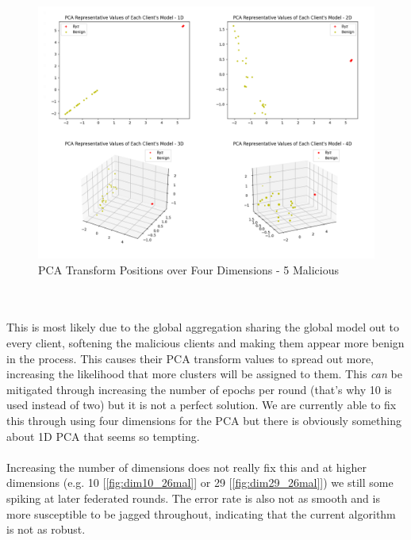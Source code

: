 \begin{figure}[htbp]
	\centering
    \includegraphics[scale=0.33]{my_agg/graphs/5mal_dims.png}
	\caption{PCA Transform Positions over Four Dimensions - 5 Malicious}
	\label{fig:5mal_dims}
\end{figure}
\\ \\
This is most likely due to the global aggregation sharing the global model out to every client, softening the malicious clients and making them appear more benign in the process.
This causes their PCA transform values to spread out more, increasing the likelihood that more clusters will be assigned to them.
This \textit{can} be mitigated through increasing the number of epochs per round (that's why 10 is used instead of two) but it is not a perfect solution.
We are currently able to fix this through using four dimensions for the PCA but there is obviously something about 1D PCA that seems so tempting.
\\ \\
Increasing the number of dimensions does not really fix this and at higher dimensions (e.g. 10 [\ref{fig:dim10_26mal}] or 29 [\ref{fig:dim29_26mal}]) we still some spiking at later federated rounds.
The error rate is also not as smooth and is more susceptible to be jagged throughout, indicating that the current algorithm is not as robust.



